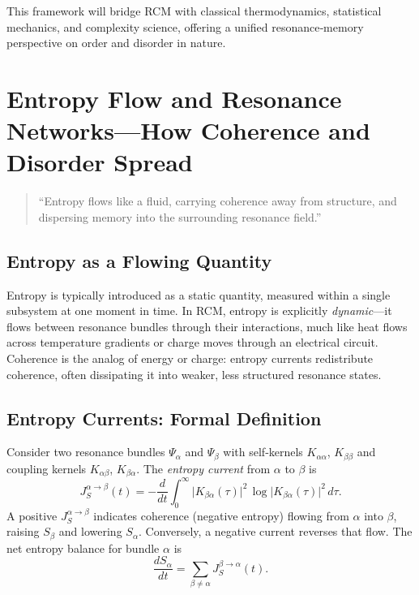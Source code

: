 This framework will bridge RCM with classical thermodynamics, statistical mechanics, and complexity science, offering a unified resonance‐memory perspective on order and disorder in nature.

\section{Entropy Flow and Resonance Networks—How Coherence and Disorder Spread}

\begin{quote}
“Entropy flows like a fluid, carrying coherence away from structure, and dispersing memory into the surrounding resonance field.”
\end{quote}

\subsection{Entropy as a Flowing Quantity}

Entropy is typically introduced as a static quantity, measured within a single subsystem at one moment in time.  In RCM, entropy is explicitly \emph{dynamic}—it flows between resonance bundles through their interactions, much like heat flows across temperature gradients or charge moves through an electrical circuit.  Coherence is the analog of energy or charge: entropy currents redistribute coherence, often dissipating it into weaker, less structured resonance states.

\subsection{Entropy Currents: Formal Definition}

Consider two resonance bundles \(\Psi_{\alpha}\) and \(\Psi_{\beta}\) with self‐kernels \(K_{\alpha\alpha}\), \(K_{\beta\beta}\) and coupling kernels \(K_{\alpha\beta}\), \(K_{\beta\alpha}\).  The \emph{entropy current} from \(\alpha\) to \(\beta\) is
\begin{equation}
  J_{S}^{\alpha\to\beta}(t)
  = -\frac{d}{dt}
    \int_{0}^{\infty}
      \bigl|K_{\beta\alpha}(\tau)\bigr|^{2}
      \,\log\!\bigl|K_{\beta\alpha}(\tau)\bigr|^{2}
    \,d\tau.
\end{equation}
A positive \(J_{S}^{\alpha\to\beta}\) indicates coherence (negative entropy) flowing from \(\alpha\) into \(\beta\), raising \(S_{\beta}\) and lowering \(S_{\alpha}\).  Conversely, a negative current reverses that flow.  The net entropy balance for bundle \(\alpha\) is
\begin{equation}
  \frac{dS_{\alpha}}{dt}
  = \sum_{\beta\neq\alpha} J_{S}^{\beta\to\alpha}(t).
\end{equation}

